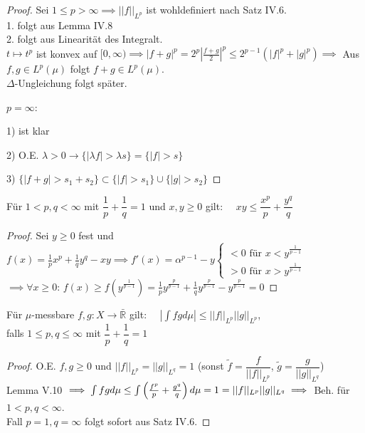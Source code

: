   \begin{proof}
    Sei $1 \leq p >\infty \implies ||f||_{L^p}$ ist wohldefiniert nach Satz IV.6. \\
    1. folgt aus Lemma IV.8 \\
    2. folgt aus Linearität des Integralt. \\
    $t \mapsto t^p$ ist konvex auf $[0,\infty) \implies |f+g|^p = 2^p \left| \frac{f+g}{2}\right| ^p \leq 2^{p-1} (|f|^p + |g|^p) \implies$ Aus $f,g \in L^p(\mu)$ folgt $f+g\in L^p(\mu)$. \\
    $\Delta$-Ungleichung folgt später. \\
    \item[$p=\infty$:] 
    \item[1)] ist klar
    \item[2)] O.E. $\lambda >0 \rightarrow \{|\lambda f| > \lambda s\} = \{|f| > s \}$
    \item[3)] $\{|f+g| > s_1+s_2 \}\subset \{|f|>s_1 \}\cup \{|g|>s_2 \}$
  \end{proof}

  \begin{lemma}
    Für $1 < p,q < \infty$ mit $\dfrac{1}{p} + \dfrac{1}{q} = 1$ und $x,y \geq 0$ gilt: \ \ $xy \leq \dfrac{x^p}{p} + \dfrac{y^q}{q}$
  \end{lemma}

  \begin{proof}
    Sei $y\geq 0$ fest und $f(x) = \frac{1}{p}x^p +\frac{1}{q}y^q -xy \implies f'(x) = \alpha^{p-1}-y \begin{cases} <0 \text{ für } x<y^{\frac{1}{p-1}} \\ > 0 \text{ für } x>y^{\frac{1}{p-1}}\end{cases} $ \\
    $\implies \forall x\geq 0$: $f(x) \geq f(y^{\frac{1}{p-1}}) = \frac{1}{p} y^{\frac{p}{p-1}}+\frac{1}{q} y^{\frac{p}{p-1}} - y^{\frac{p}{p-1}} = 0$
  \end{proof}

  \begin{theorem}
    Für $\mu$-messbare $f,g: X \to \bar{\mathbb{R}}$ gilt: \ \ $|\int fg d\mu| \leq ||f||_{L^p} ||g||_{L^p}$,\\
    falls $1 \leq p,q \leq \infty$ mit $\dfrac{1}{p} + \dfrac{1}{q} = 1$
  \end{theorem}

  \begin{proof}
    O.E. $f,g \geq 0$ und $||f||_{L^p} = ||g||_{L^q} = 1$ (sonst $\tilde{f} = \dfrac{f}{||f||_{L^p}}$, $\tilde{g} = \dfrac{g}{||g||_{L^q}}$) \\
    Lemma V.10 $\implies \int fg d\mu \leq \int \left(\frac{f^p}{p}+\frac{g^q}{q} \right)d\mu = 1 = ||f||_{L^p} ||g||_{L^q} \\ \implies$ Beh. für $1 < p,q < \infty$. \\
    Fall $p=1, q =\infty$ folgt sofort aus Satz IV.6.
  \end{proof}

